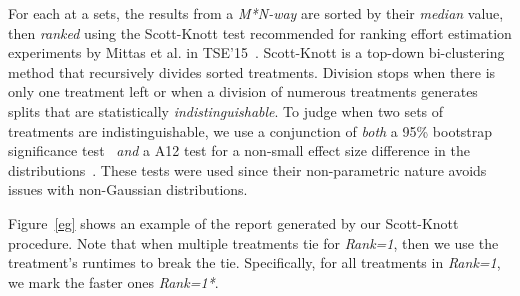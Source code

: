 \documentclass[10pt,conference]{IEEEtran}
\begin{document}
For each at a sets, the results from a {\em M*N-way} are sorted by their {\em  median} value, then {\em ranked} using the Scott-Knott test
recommended for ranking effort estimation experiments by Mittas et al. in TSE'15~\cite{Mittas13}. Scott-Knott is a top-down bi-clustering
method that recursively divides sorted treatments. Division stops when there is only one treatment left or when a division of numerous treatments generates 
splits that are statistically {\em indistinguishable}. 
To judge when two sets of treatments are indistinguishable, we use a conjunction of {\em both}  a 95\% bootstrap significance test~\cite{efron93} {\em and}
a A12 test for a non-small effect size difference in the distributions~\cite{MenziesNeg:2017}. These tests were used since their non-parametric nature avoids issues with non-Gaussian
distributions.  

Figure~\ref{eg} shows an example of the report generated by our Scott-Knott procedure.
Note that when multiple treatments tie for {\em Rank=1}, then we use the treatment's
runtimes to break the tie. Specifically, for all treatments in {\em Rank=1}, we mark the faster ones {\em Rank=1*}.
\end{document}
